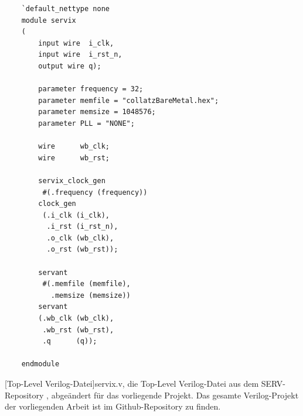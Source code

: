     \begin{verbatim}
    `default_nettype none
    module servix
    (
        input wire  i_clk,
        input wire  i_rst_n,
        output wire q);

        parameter frequency = 32;
        parameter memfile = "collatzBareMetal.hex";
        parameter memsize = 1048576;
        parameter PLL = "NONE";

        wire      wb_clk;
        wire      wb_rst;

        servix_clock_gen
         #(.frequency (frequency))
        clock_gen
         (.i_clk (i_clk),
          .i_rst (i_rst_n),
          .o_clk (wb_clk),
          .o_rst (wb_rst));

        servant
         #(.memfile (memfile),
           .memsize (memsize))
        servant
        (.wb_clk (wb_clk),
         .wb_rst (wb_rst),
         .q      (q));

    endmodule
    \end{verbatim}
    [Top-Level Verilog-Datei]{servix.v, die Top-Level Verilog-Datei aus dem SERV-Repository \parencite{kindgren_serv}, abgeändert für das vorliegende Projekt. Das gesamte Verilog-Projekt der vorliegenden Arbeit ist im Github-Repository \parencite{GitHub-Bachelorarbeit} zu finden.}
    \label{lst:servix.v}
